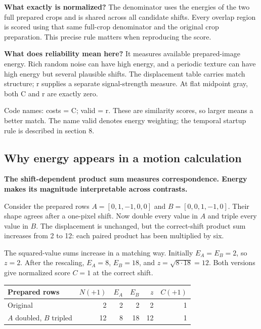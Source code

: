 \documentclass[11pt,letterpaper]{article}
\begin{document}
\textbf{What exactly is normalized?} The denominator uses the energies of the two full prepared crops and is shared across all candidate shifts. Every overlap region is scored using that same full-crop denominator and the original crop preparation. This precise rule matters when reproducing the score.


\textbf{What does reliability mean here?} It measures available prepared-image energy. Rich random noise can have high energy, and a periodic texture can have high energy but several plausible shifts. The displacement table carries match structure; r supplies a separate signal-strength measure. At flat midpoint gray, both C and r are exactly zero.


{
\small\color{muted} Code names: costs = C; valid = r. These are similarity scores, so larger means a better match. The name valid denotes energy weighting; the temporal startup rule is described in section 8.\par}


\clearpage


\clearpage
\subsection*{Why energy appears in a motion calculation}
\textbf{The shift-dependent product sum measures correspondence. Energy makes its magnitude interpretable across contrasts.}

Consider the prepared rows $A=[0,1,-1,0,0]$ and $B=[0,0,1,-1,0]$. Their shape agrees after a one-pixel shift. Now double every value in $A$ and triple every value in $B$. The displacement is unchanged, but the correct-shift product sum increases from 2 to 12: each paired product has been multiplied by six.

The squared-value sums increase in a matching way. Initially $E_A=E_B=2$, so $z=2$. After the rescaling, $E_A=8$, $E_B=18$, and $z=\sqrt{8\cdot18}=12$. Both versions give normalized score $C=1$ at the correct shift.

\begin{center}\renewcommand{\arraystretch}{1.3}
\begin{tabular}{lrrrrr}\toprule
Prepared rows & $N(+1)$ & $E_A$ & $E_B$ & $z$ & $C(+1)$\\\midrule
Original & 2 & 2 & 2 & 2 & 1\\
$A$ doubled, $B$ tripled & 12 & 8 & 18 & 12 & 1\\\bottomrule
\end{tabular}\end{center}
\end{document}
